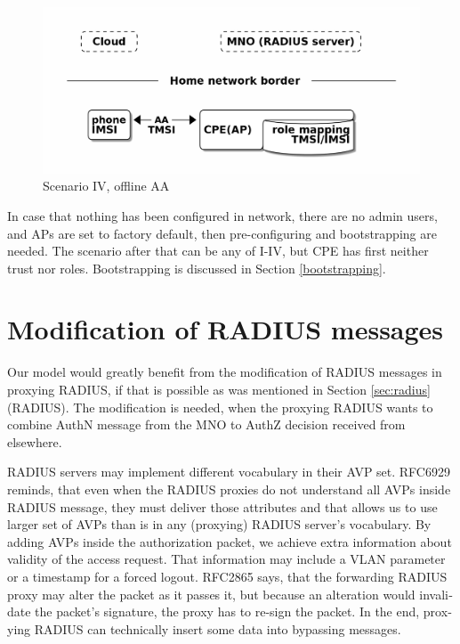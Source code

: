 \documentclass[12pt,a4paper,english]{tutthesis}
\begin{document}
\begin{otherlanguage}{english}
\begin{figure}[htb]
\centering
\includegraphics[width=.9\linewidth]{scenIV.png}
\caption{\label{fig:scenario-IV}Scenario IV, offline AA}
\end{figure}







In case that nothing has been configured in network, there are no 
admin users, and APs are set to factory default, then 
pre-configuring and bootstrapping are needed. The scenario after that can be any
of I-IV, but CPE  has first neither trust nor roles. Bootstrapping is discussed in 
Section \ref{bootstrapping}.


\section{Modification of RADIUS messages}
\label{sec-4-3}
\label{sec:radius-macs}

Our model would greatly benefit from the modification of RADIUS messages in proxying
RADIUS, if that is possible as was mentioned in Section \ref{sec:radius}(RADIUS).
The modification is needed, when the proxying RADIUS wants to combine AuthN message
from the MNO to AuthZ decision received from elsewhere.




RADIUS servers may implement different vocabulary in their AVP set.
RFC6929\cite{rfc6929} reminds, that even when
the RADIUS proxies do not understand all AVPs inside RADIUS message, they
must deliver those attributes and that allows us to use larger set of AVPs 
than is in any (proxying) RADIUS server's vocabulary.
By adding AVPs inside the authorization packet, we achieve extra
information about validity of the access request.
That information may include a VLAN parameter or a timestamp for a forced
logout.
RFC2865\cite{rfc2865} says, that the forwarding RADIUS proxy may alter
the packet as it passes it, but because an alteration would invalidate the
packet's signature, the proxy has to re-sign the packet.
In the end, proxying RADIUS can technically insert some data into 
bypassing messages.






\end{otherlanguage}
\end{document}
